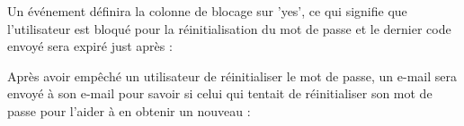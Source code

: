 \documentclass{article}
\begin{document}
\begin{enumerate}
\begin{enumerate}
\begin{enumerate}
         \vspace{0.5cm}

		\hspace*{-1.05in}
               \noindent{}
         
        
        Un événement définira la colonne de blocage sur 'yes', ce qui signifie que l'utilisateur est bloqué pour la réinitialisation du mot de passe et le dernier code envoyé sera expiré just après :
        
        \vspace{0.4cm}
        \hspace*{-1.05in}
               \noindent{}
        
        
       Après avoir empêché un utilisateur de réinitialiser le mot de passe, un e-mail sera envoyé à son e-mail pour savoir si celui qui tentait de réinitialiser son mot de passe pour l'aider à en obtenir un nouveau :
        

\end{enumerate}
\end{enumerate}
\end{enumerate}
\end{document}
